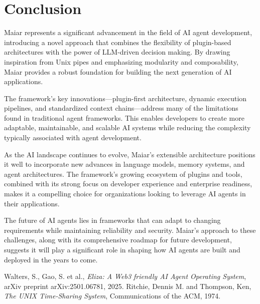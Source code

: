 \documentclass[12pt]{article}
\begin{document}
\section{Conclusion}
Maiar represents a significant advancement in the field of AI agent development, introducing a novel approach that combines the flexibility of plugin-based architectures with the power of LLM-driven decision making. By drawing inspiration from Unix pipes and emphasizing modularity and composability, Maiar provides a robust foundation for building the next generation of AI applications.

The framework's key innovations—plugin-first architecture, dynamic execution pipelines, and standardized context chains—address many of the limitations found in traditional agent frameworks. This enables developers to create more adaptable, maintainable, and scalable AI systems while reducing the complexity typically associated with agent development.

As the AI landscape continues to evolve, Maiar's extensible architecture positions it well to incorporate new advances in language models, memory systems, and agent architectures. The framework's growing ecosystem of plugins and tools, combined with its strong focus on developer experience and enterprise readiness, makes it a compelling choice for organizations looking to leverage AI agents in their applications.

The future of AI agents lies in frameworks that can adapt to changing requirements while maintaining reliability and security. Maiar's approach to these challenges, along with its comprehensive roadmap for future development, suggests it will play a significant role in shaping how AI agents are built and deployed in the years to come.

\begin{thebibliography}{9}
 Walters, S., Gao, S. et al., \textit{Eliza: A Web3 friendly AI Agent Operating System}, arXiv preprint arXiv:2501.06781, 2025.
 Ritchie, Dennis M. and Thompson, Ken, \textit{The UNIX Time-Sharing System}, Communications of the ACM, 1974.
\end{thebibliography}
\end{document}
